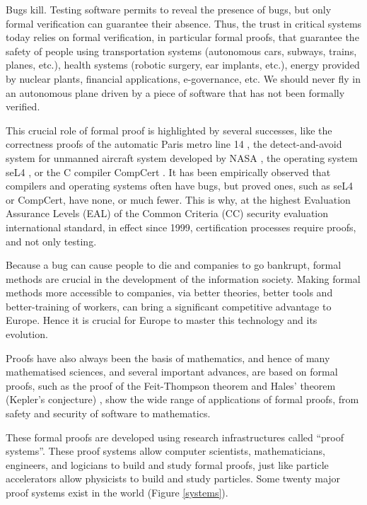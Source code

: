 \thispagestyle{empty}

Bugs kill.  Testing software permits to reveal the presence of bugs,
but only formal verification can guarantee their absence.  Thus, the
trust in critical systems today relies on formal verification, in
particular formal proofs, that guarantee the safety of people
using transportation systems (autonomous cars, subways, trains,
planes, etc.), health systems (robotic surgery, ear implants, etc.), energy provided
by nuclear plants, financial applications, e-governance, etc.  We
should never fly in an autonomous plane driven by a piece of software
that has not been formally verified.

This crucial role of formal proof is highlighted by several successes,
like the correctness proofs of the automatic Paris metro line 14
\cite{Behm98,Lecomte17}, the detect-and-avoid system for unmanned aircraft
system developed by NASA \cite{Munoz16}, the operating system seL4
\cite{Klein09}, or the C compiler CompCert \cite{Leroy06}.  It has
been empirically observed that compilers and operating systems often
have bugs, but proved ones, such as seL4 or CompCert, have none, or
much fewer.  This is why, at the highest Evaluation Assurance Levels (EAL)
of the Common Criteria (CC) security evaluation international standard, in
effect since 1999, certification processes require proofs, and not
only testing.

Because a bug can cause people to die and companies to go bankrupt,
formal methods are crucial in the development of the information
society. Making formal methods more accessible to companies, via
better theories, better tools and better-training of workers, can
bring a significant competitive advantage to Europe.  Hence it is
crucial for Europe to master this technology and its evolution.

Proofs have also always been the basis of mathematics, and hence of
many mathematised sciences, and several important advances, are based
on formal proofs, such as the proof of the Feit-Thompson theorem
\cite{Gonthier13} and Hales' theorem (Kepler's conjecture)
\cite{Hales17}, show the wide range of applications of formal proofs,
from safety and security of software to mathematics.

These formal proofs are developed using research infrastructures called
``proof systems''.  These proof systems allow computer scientists,
mathematicians, engineers, and logicians to build and study formal
proofs, just like particle accelerators allow physicists to build and
study particles.  Some twenty major proof systems exist in the world
(Figure \ref{systems}).

